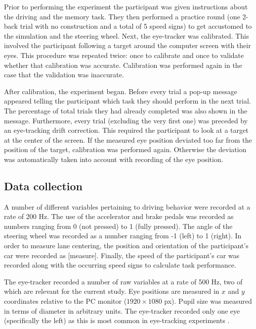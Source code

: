 Prior to performing the experiment the participant was given instructions about the driving and the memory task. 
They then performed a practice round (one 2-back trial with no construction and a total of 5 speed signs) to get accustomed to the simulation and the steering wheel. 
Next, the eye-tracker was calibrated. 
This involved the participant following a target around the computer screen with their eyes. 
This procedure was repeated twice: once to calibrate and once to validate whether that calibration was accurate. 
Calibration was performed again in the case that the validation was inaccurate.

After calibration, the experiment began. 
Before every trial a pop-up message appeared telling the participant which \nback task they should perform in the next trial. 
The percentage of total trials they had already completed was also shown in the message. 
Furthermore, every trial (excluding the very first one) was preceded by an eye-tracking drift correction. 
This required the participant to look at a target at the center of the screen. 
If the measured eye position deviated too far from the position of the target, calibration was performed again. 
Otherwise the deviation was automatically taken into account with recording of the eye position. 

\subsection{Data collection}
A number of different variables pertaining to driving behavior were recorded at a rate of 200 Hz. 
The use of the accelerator and brake pedals was recorded as numbers ranging from 0 (not pressed) to 1 (fully pressed). 
The angle of the steering wheel was recorded as a number ranging from -1 (left) to 1 (right).
In order to measure lane centering, the position and orientation of the participant's car were recorded as [measure]. 
Finally, the speed of the participant's car was recorded along with the occurring speed signs to calculate \nback task performance. 

The eye-tracker recorded a number of raw variables at a rate of 500 Hz, two of which are relevant for the current study.
Eye positions are measured in \(x\) and \(y\) coordinates relative to the PC monitor (\(1920 \times 1080\) px).
Pupil size was measured in terms of diameter in arbitrary units.
The eye-tracker recorded only one eye (specifically the left) as this is most common in eye-tracking experiments \citep{Hutton2019}.

